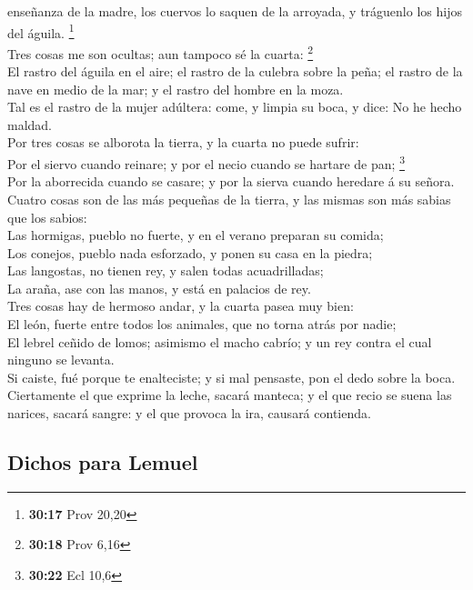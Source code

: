 enseñanza de la madre, los cuervos lo saquen de la arroyada, y tráguenlo
los hijos del águila. \footnote{\textbf{30:17} Prov 20,20}\\
 Tres cosas me son ocultas; aun tampoco sé la cuarta:
\footnote{\textbf{30:18} Prov 6,16}\\
 El rastro del águila en el aire; el rastro de la culebra
sobre la peña; el rastro de la nave en medio de la mar; y el rastro del
hombre en la moza.\\
 Tal es el rastro de la mujer adúltera: come, y limpia su
boca, y dice: No he hecho maldad.\\
 Por tres cosas se alborota la tierra, y la cuarta no puede
sufrir:\\
 Por el siervo cuando reinare; y por el necio cuando se
hartare de pan; \footnote{\textbf{30:22} Ecl 10,6}\\
 Por la aborrecida cuando se casare; y por la sierva cuando
heredare á su señora.\\
 Cuatro cosas son de las más pequeñas de la tierra, y las
mismas son más sabias que los sabios:\\
 Las hormigas, pueblo no fuerte, y en el verano preparan su
comida;\\
 Los conejos, pueblo nada esforzado, y ponen su casa en la
piedra;\\
 Las langostas, no tienen rey, y salen todas
acuadrilladas;\\
 La araña, ase con las manos, y está en palacios de rey.\\
 Tres cosas hay de hermoso andar, y la cuarta pasea muy
bien:\\
 El león, fuerte entre todos los animales, que no torna
atrás por nadie;\\
 El lebrel ceñido de lomos; asimismo el macho cabrío; y un
rey contra el cual ninguno se levanta.\\
 Si caiste, fué porque te enalteciste; y si mal pensaste,
pon el dedo sobre la boca.\\
 Ciertamente el que exprime la leche, sacará manteca; y el
que recio se suena las narices, sacará sangre: y el que provoca la ira,
causará contienda.

\hypertarget{dichos-para-lemuel}{%
\subsection{Dichos para Lemuel}\label{dichos-para-lemuel}}

